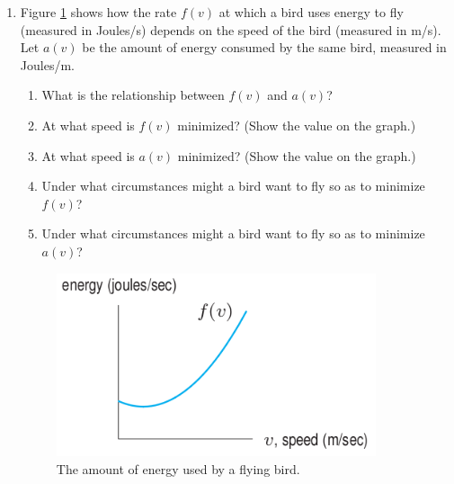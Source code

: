 \documentclass[12pt]{article}
\begin{document}
\begin{enumerate}
\setlength{\itemsep}{3mm}

\item Figure \ref{fig:birds} shows how the rate $f(v)$ at which a bird
  uses energy to fly (measured in Joules/s) depends on the speed of
  the bird (measured in m/s).  Let $a(v)$ be the amount of energy
  consumed by the same bird, measured in Joules/m.
  \begin{enumerate}
    \setlength{\itemsep}{0mm}
  \item What is the relationship between $f(v)$ and $a(v)$?
  \item At what speed is $f(v)$ minimized? (Show the value on the graph.)
  \item At what speed is $a(v)$ minimized? (Show the value on the graph.)
  \item Under what circumstances might a bird want to fly so as to
    minimize $f(v)$?
    \item Under what circumstances might a bird want to fly so as to
      minimize $a(v)$?
  \end{enumerate}

  
\begin{figure}[h!]
\begin{center}
\vspace{-1mm}
\includegraphics[width=3.7in]{birds.png}
\vspace{-2mm}
\caption{The amount of energy used by a flying bird.}
\label{fig:birds}
\vspace{-5mm}
\end{center}
\end{figure}



\end{enumerate}
\end{document}
